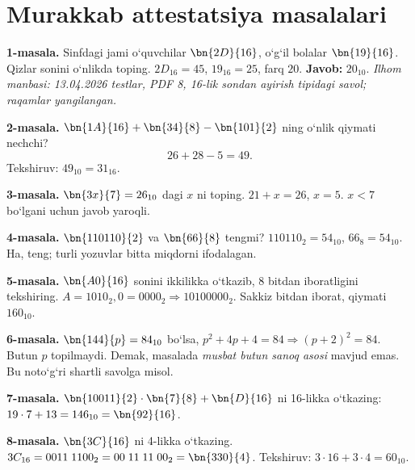 \documentclass[11pt,a4paper,openany,oneside]{book}
\begin{document}
\chapter{Murakkab attestatsiya masalalari}
\begin{worked}
\textbf{1-masala.} Sinfdagi jami o‘quvchilar \(\bn{2D}{16}\), o‘g‘il bolalar \(\bn{19}{16}\). Qizlar sonini o‘nlikda toping.
\(2D_{16}=45\), \(19_{16}=25\), farq \(20\). \textbf{Javob:} \(20_{10}\). \emph{Ilhom manbasi: 13.04.2026 testlar, PDF 8, 16-lik sondan ayirish tipidagi savol; raqamlar yangilangan.}
\end{worked}
\begin{worked}
\textbf{2-masala.} \(\bn{1A}{16}+\bn{34}{8}-\bn{101}{2}\) ning o‘nlik qiymati nechchi?
\[26+28-5=\boxed{49}.\]
Tekshiruv: \(49_{10}=31_{16}\).
\end{worked}
\begin{worked}
\textbf{3-masala.} \(\bn{3x}{7}=26_{10}\) dagi \(x\) ni toping. \(21+x=26\), \(x=5\). \(x<7\) bo‘lgani uchun javob yaroqli.
\end{worked}
\begin{worked}
\textbf{4-masala.} \(\bn{110110}{2}\) va \(\bn{66}{8}\) tengmi? \(110110_2=54_{10}\), \(66_8=54_{10}\). Ha, teng; turli yozuvlar bitta miqdorni ifodalagan.
\end{worked}
\begin{worked}
\textbf{5-masala.} \(\bn{A0}{16}\) sonini ikkilikka o‘tkazib, 8 bitdan iboratligini tekshiring. \(A=1010_2,0=0000_2\Rightarrow10100000_2\). Sakkiz bitdan iborat, qiymati \(160_{10}\).
\end{worked}
\begin{worked}
\textbf{6-masala.} \(\bn{144}{p}=84_{10}\) bo‘lsa, \(p^2+4p+4=84\Rightarrow(p+2)^2=84\). Butun \(p\) topilmaydi. Demak, masalada \emph{musbat butun sanoq asosi} mavjud emas. Bu noto‘g‘ri shartli savolga misol.
\end{worked}
\begin{worked}
\textbf{7-masala.} \(\bn{10011}{2}\cdot\bn{7}{8}+\bn{D}{16}\) ni 16-likka o‘tkazing: \(19\cdot7+13=146_{10}=\bn{92}{16}\).
\end{worked}
\begin{worked}
\textbf{8-masala.} \(\bn{3C}{16}\) ni 4-likka o‘tkazing. \(3C_{16}=0011\;1100_2=00\;11\;11\;00_2=\bn{330}{4}\). Tekshiruv: \(3\cdot16+3\cdot4=60_{10}\).
\end{worked}
\end{document}
